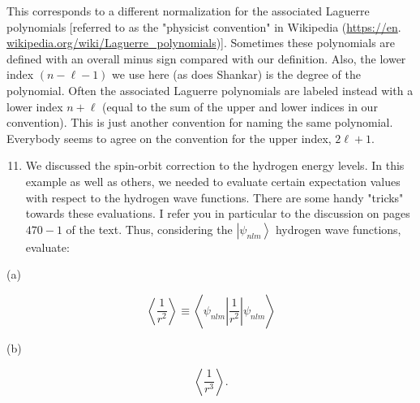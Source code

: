 \documentclass[12pt]{article}
\begin{document}
This corresponds to a different normalization for the associated Laguerre polynomials [referred to as the "physicist convention" in Wikipedia (\href{https://en}{https://en}. \href{http://wikipedia.org/wiki/Laguerre_polynomials}{wikipedia.org/wiki/Laguerre\_polynomials})]. Sometimes these polynomials are defined with an overall minus sign compared with our definition. Also, the lower index $(n-\ell-1)$ we use here (as does Shankar) is the degree of the polynomial. Often the associated Laguerre polynomials are labeled instead with a lower index $n+\ell$ (equal to the sum of the upper and lower indices in our convention). This is just another convention for naming the same polynomial. Everybody seems to agree on the convention for the upper index, $2 \ell+1$.

\begin{enumerate}
  \setcounter{enumi}{10}
  \item We discussed the spin-orbit correction to the hydrogen energy levels. In this example as well as others, we needed to evaluate certain expectation values with respect to the hydrogen wave functions. There are some handy "tricks" towards these evaluations. I refer you in particular to the discussion on pages $470-1$ of the text. Thus, considering the $\left|\psi_{n l m}\right\rangle$ hydrogen wave functions, evaluate:
\end{enumerate}

(a)

$$
\left\langle\frac{1}{r^{2}}\right\rangle \equiv\left\langle\psi_{n l m}\left|\frac{1}{r^{2}}\right| \psi_{n l m}\right\rangle
$$

(b)

$$
\left\langle\frac{1}{r^{3}}\right\rangle .
$$
\end{document}
